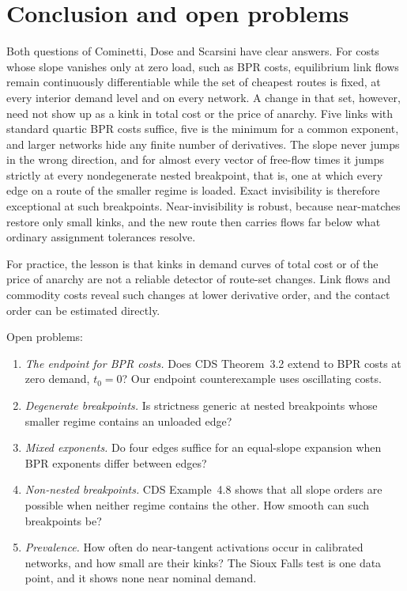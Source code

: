 \section{Conclusion and open problems}\label{sec:conclusion}

Both questions of Cominetti, Dose and Scarsini have clear answers. For costs whose slope vanishes only at zero load, such as BPR costs, equilibrium link flows remain continuously differentiable while the set of cheapest routes is fixed, at every interior demand level and on every network. A change in that set, however, need not show up as a kink in total cost or the price of anarchy. Five links with standard quartic BPR costs suffice, five is the minimum for a common exponent, and larger networks hide any finite number of derivatives. The slope never jumps in the wrong direction, and for almost every vector of free-flow times it jumps strictly at every nondegenerate nested breakpoint, that is, one at which every edge on a route of the smaller regime is loaded. Exact invisibility is therefore exceptional at such breakpoints. Near-invisibility is robust, because near-matches restore only small kinks, and the new route then carries flows far below what ordinary assignment tolerances resolve.

For practice, the lesson is that kinks in demand curves of total cost or of the price of anarchy are not a reliable detector of route-set changes. Link flows and commodity costs reveal such changes at lower derivative order, and the contact order can be estimated directly.

Open problems:
\begin{enumerate}[nosep]
\item \emph{The endpoint for BPR costs.} Does CDS Theorem~3.2 extend to BPR costs at zero demand, $t_0=0$? Our endpoint counterexample uses oscillating costs.
\item \emph{Degenerate breakpoints.} Is strictness generic at nested breakpoints whose smaller regime contains an unloaded edge?
\item \emph{Mixed exponents.} Do four edges suffice for an equal-slope expansion when BPR exponents differ between edges?
\item \emph{Non-nested breakpoints.} CDS Example~4.8 shows that all slope orders are possible when neither regime contains the other. How smooth can such breakpoints be?
\item \emph{Prevalence.} How often do near-tangent activations occur in calibrated networks, and how small are their kinks? The Sioux Falls test is one data point, and it shows none near nominal demand.
\end{enumerate}
